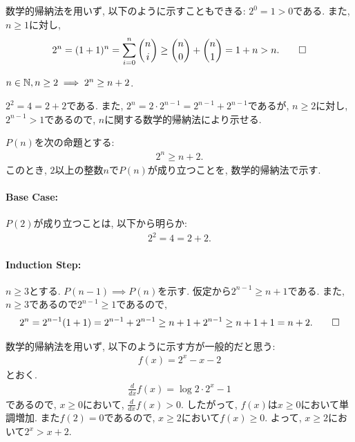 \begin{rem}
  数学的帰納法を用いず, 以下のように示すこともできる:
  $2^0=1>0$である.
  また, $n\geq 1$に対し,
  \begin{align*}
    2^n=(1+1)^n=\sum_{i=0}^n \binom{n}{i}\geq \binom{n}{0}+\binom{n}{1}=1+n>n
    .\qedhere
  \end{align*}
\end{rem}

\begin{prop}
  \label{p:20230809}
  $n\in\mathbb{N}, n\geq 2\implies 2^n \geq n+2$.
\end{prop}
\begin{proof**}
  $2^2=4=2+2$である.
  また,
  $2^n=2\cdot 2^{n-1}=2^{n-1}+2^{n-1}$であるが,
  $n\geq 2$に対し,
  $2^{n-1} > 1$であるので,
  $n$に関する数学的帰納法により示せる.
\end{proof**}
\begin{proof*}
  $P(n)$を次の命題とする:
  \begin{align*}
    2^n \geq n+2
    .
  \end{align*}
  このとき,
  $2$以上の整数$n$で$P(n)$が成り立つことを,
  数学的帰納法で示す.

  \paragraph{Base Case:}
  $P(2)$が成り立つことは, 以下から明らか:
  \begin{align*}
    2^2=4=2+2.
  \end{align*}
  \paragraph{Induction Step:}
  $n\geq 3$とする.
  $P(n-1)\implies P(n)$を示す.
  仮定から$2^{n-1}\geq n+1$である.
  また, $n\geq 3$であるので$2^{n-1}\geq 1$であるので,
  \begin{align*}
    2^n=2^{n-1}(1+1)=2^{n-1}+2^{n-1}\geq n+1+2^{n-1}\geq n+1+1=n+2
    .\qedhere
  \end{align*}
\end{proof*}

\begin{rem}
  数学的帰納法を用いず, 以下のように示す方が一般的だと思う:
  \begin{align*}
    f(x)=2^x-x-2
  \end{align*}
  とおく.
  \begin{align*}
    \frac{d}{dx}f(x)=\log 2 \cdot 2^x-1
  \end{align*}
  であるので, $x\geq 0$において, $\frac{d}{dx}f(x)> 0$.
  したがって, $f(x)$は$x\geq 0$において単調増加.
  また$f(2)=0$であるので,
  $x\geq 2$において$f(x)\geq 0$.
  よって, $x\geq 2$において$2^x>x+2$.
\end{rem}

